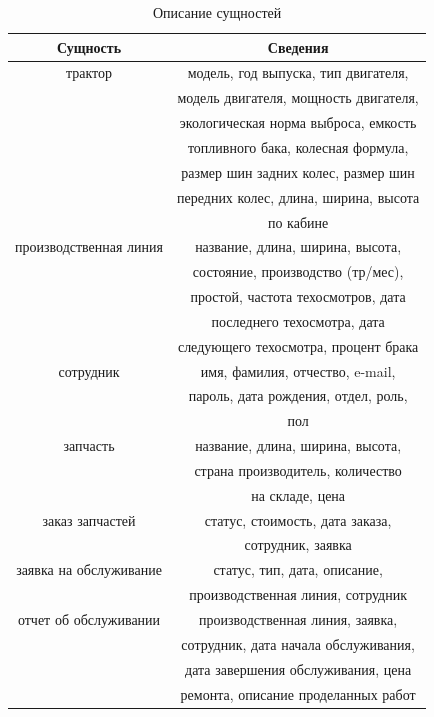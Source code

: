 \begin{table}[H]
    \centering
    \begin{tabular}{|c|c|} \hline 
        \textbf{Сущность} &  \textbf{Сведения}\\ \hline 
        трактор \multirow{3}{*}{} 
        & модель, год выпуска, тип двигателя,\\
        & модель двигателя, мощность двигателя,\\
        & экологическая норма выброса, емкость \\
        & топливного бака, колесная формула, \\
        & размер шин задних колес, размер шин \\
        & передних колес, длина, ширина, высота\\
        & по кабине \\ \hline

        производственная линия
        \multirow{3}{*}{} 
        & название, длина, ширина, высота, \\
        & состояние, производство (тр/мес), \\
        & простой, частота техосмотров, дата \\
        & последнего техосмотра, дата \\
        & следующего техосмотра, процент брака \\ \hline

        сотрудник
        \multirow{3}{*}{} 
        & имя, фамилия, отчество, e-mail,\\
        & пароль, дата рождения, отдел, роль, \\
        & пол \\ \hline

        запчасть
        \multirow{3}{*}{} 
        & название, длина, ширина, высота, \\
        & страна производитель, количество\\
        & на складе, цена \\ \hline

        заказ запчастей
        \multirow{3}{*}{} 
        & статус, стоимость, дата заказа, \\
        & сотрудник, заявка \\ \hline

        заявка на обслуживание
        \multirow{3}{*}{} 
        & статус, тип, дата, описание, \\
        & производственная линия, сотрудник \\ \hline

        отчет об обслуживании
        \multirow{3}{*}{} 
        & производственная линия, заявка,\\
        & сотрудник, дата начала обслуживания,\\
        & дата завершения обслуживания, цена \\
        & ремонта, описание проделанных работ \\ \hline
    \end{tabular}
    \caption{Описание сущностей}
    \label{tab:er}
\end{table}

